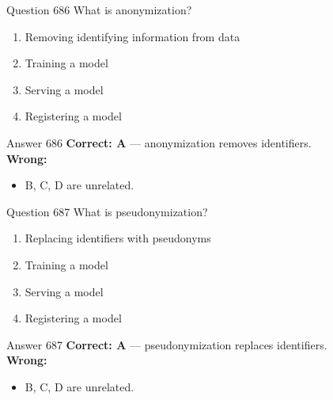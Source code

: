 \documentclass[aspectratio=169,11pt]{beamer}
\begin{document}
	\begin{frame}{Question 686}
		What is anonymization?
		\begin{enumerate}[label=\Alph*.]
			\item Removing identifying information from data
			\item Training a model
			\item Serving a model
			\item Registering a model
		\end{enumerate}
	\end{frame}
	\begin{frame}{Answer 686}
		\textbf{Correct: A} --- anonymization removes identifiers.\\
		\vspace{0.5em}
		\textbf{Wrong:}
		\begin{itemize}
			\item B, C, D are unrelated.
		\end{itemize}
	\end{frame}
	
	\begin{frame}{Question 687}
		What is pseudonymization?
		\begin{enumerate}[label=\Alph*.]
			\item Replacing identifiers with pseudonyms
			\item Training a model
			\item Serving a model
			\item Registering a model
		\end{enumerate}
	\end{frame}
	\begin{frame}{Answer 687}
		\textbf{Correct: A} --- pseudonymization replaces identifiers.\\
		\vspace{0.5em}
		\textbf{Wrong:}
		\begin{itemize}
			\item B, C, D are unrelated.
		\end{itemize}
	\end{frame}
	
\end{document}
